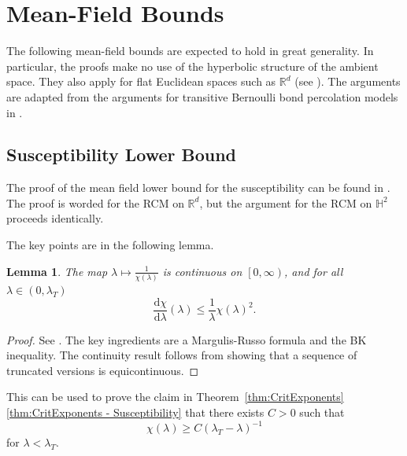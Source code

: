 \documentclass[10pt,a4paper,dvipsnames]{article}
\newtheorem{lemma}[theorem]{Lemma}
\theoremstyle{definition}
\theoremstyle{remark}
\newcommand{\Rd}{\mathbb R^d}
\newcommand{\HypTwo}{{\mathbb{H}^2}}
\newcommand{\dd}{\mathrm{d}} %
\numberwithin{equation}{section}
\begin{document}
\section{Mean-Field Bounds}
\label{sec-MFbounds}

The following mean-field bounds are expected to hold in great generality. In particular, the proofs make no use of the hyperbolic structure of the ambient space. They also apply for flat Euclidean spaces such as $\Rd$ (see \cite{HeyHofLasMat19,caicedo2023critical}). The arguments are adapted from the arguments for transitive Bernoulli bond percolation models in \cite{AizNew84,AizBar87}.



\subsection{Susceptibility Lower Bound}

The proof of the mean field lower bound for the susceptibility can be found in \cite{HeyHofLasMat19}. The proof is worded for the RCM on $\Rd$, but the argument for the RCM on $\HypTwo$ proceeds identically.

The key points are in the following lemma.
\begin{lemma}
    The map $\lambda\mapsto \frac{1}{\chi\left(\lambda\right)}$ is continuous on $\left[0,\infty\right)$, and for all $\lambda\in\left(0,\lambda_T\right)$
    \begin{equation}\label{eq:chi2lowerbd}
        \frac{\dd \chi}{\dd \lambda}\left(\lambda\right) \leq \frac{1}{\lambda}\chi\left(\lambda\right)^2.
    \end{equation}
\end{lemma}

\begin{proof}
    See \cite[Lemma~2.3 and Proof of Theorem~1.3]{HeyHofLasMat19}. The key ingredients are a Margulis-Russo formula and the BK inequality. The continuity result follows from showing that a sequence of truncated versions is equicontinuous. 
\end{proof}

This can be used to prove the claim in Theorem~\ref{thm:CritExponents}\ref{thm:CritExponents - Susceptibility} that there exists $C>0$ such that
\begin{equation}
    \chi\left(\lambda\right) \geq C\left(\lambda_T-\lambda\right)^{-1}
\end{equation}
for $\lambda<\lambda_T$.
\end{document}
